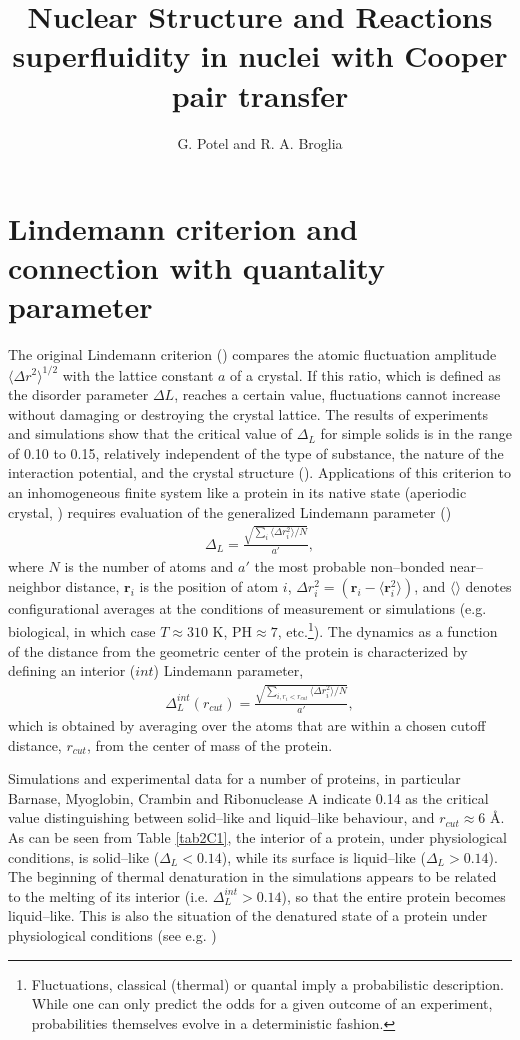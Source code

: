 \documentclass[a4paper,11pt]{book}
\title{\large{Nuclear Structure and Reactions}\\superfluidity in nuclei with Cooper pair transfer\\}
\author{G. Potel and R. A. Broglia}
\begin{document}
\section*{Lindemann criterion and connection with quantality parameter}\label{C2AppC}
The original Lindemann criterion (\cite{Lindemann:10}) compares the atomic fluctuation amplitude $\langle\Delta r^2\rangle^{1/2}$ with the lattice constant $a$ of a crystal. If this ratio, which is defined as the disorder parameter $\Delta L$, reaches a certain value, fluctuations cannot increase without damaging or destroying the crystal lattice. The results of experiments and simulations show that the critical value of $\Delta_L$ for simple solids is in the range of 0.10 to 0.15, relatively independent of the type of substance, the nature of the interaction potential, and the crystal structure (\cite{Bilgram:87,Lowen:94,Stillinger:95}). Applications of this criterion to an inhomogeneous finite system like a protein in its native state (aperiodic crystal, \cite{Schrodinger:44}) requires evaluation of the generalized Lindemann parameter (\cite{Stillinger:90})
\begin{align}
\Delta_L=\frac{\sqrt{\sum_i\langle \Delta r_i^2\rangle/N}}{a'},
\end{align}  
where $N$ is the number of atoms and $a'$ the most probable non--bonded near--neighbor distance, $\mathbf r_i$ is the position of atom $i$, $\Delta r_i^2=(\mathbf r_i-\langle \mathbf r_i^2\rangle)$, and $\langle\rangle$ denotes configurational averages at the conditions of measurement or simulations (e.g. biological, in which case $T\approx 310$ K, PH$\approx 7$, etc.\footnote{Fluctuations, classical (thermal) or quantal imply a probabilistic description. While one can only predict the odds for a given outcome of an experiment, probabilities themselves evolve in a deterministic fashion.}). The dynamics as a function of the distance from the geometric center of the protein is characterized by defining an interior ($int$) Lindemann parameter, 
\begin{align}
\Delta^{int}_L(r_{cut})=\frac{\sqrt{\sum_{i,r_i<r_{cut}}\langle \Delta r_i^2\rangle/N}}{a'},
\end{align}  
which is obtained by averaging over the atoms that are within a chosen cutoff distance, $r_{cut}$, from the center of mass of the protein.

Simulations and experimental data for a number of proteins, in particular Barnase, Myoglobin, Crambin and Ribonuclease A indicate 0.14 as the critical value distinguishing between solid--like and liquid--like behaviour, and $r_{cut}\approx 6$ \AA. As can be seen from Table \ref{tab2C1}, the interior of a protein, under physiological conditions, is solid--like  ($\Delta_L<0.14$), while its surface is liquid--like ($\Delta_L>0.14$). The beginning of thermal denaturation in the simulations appears to be related to the melting of its interior (i.e. $\Delta^{int}_L>0.14$), so that the entire protein becomes liquid--like. This is also the situation of the denatured state of a protein under physiological conditions (see e.g. \cite{Rosner:17}) 
\end{document}
